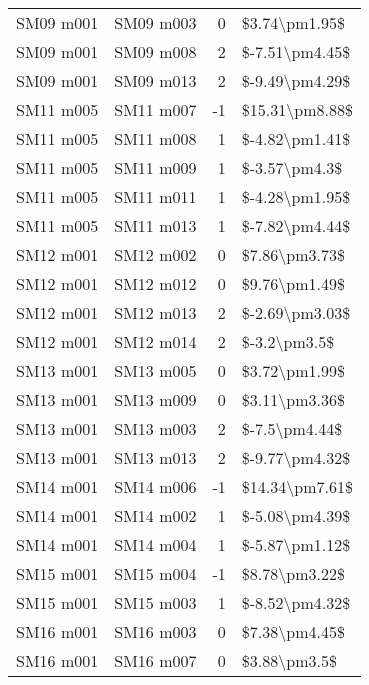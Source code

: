 \begin{longtable}{llrl}
 SM09 m001 &     SM09 m003 &       0 &   \$3.74\textbackslash pm1.95\$ \\
 SM09 m001 &     SM09 m008 &       2 &  \$-7.51\textbackslash pm4.45\$ \\
 SM09 m001 &     SM09 m013 &       2 &  \$-9.49\textbackslash pm4.29\$ \\
 SM11 m005 &     SM11 m007 &      -1 &  \$15.31\textbackslash pm8.88\$ \\
 SM11 m005 &     SM11 m008 &       1 &  \$-4.82\textbackslash pm1.41\$ \\
 SM11 m005 &     SM11 m009 &       1 &   \$-3.57\textbackslash pm4.3\$ \\
 SM11 m005 &     SM11 m011 &       1 &  \$-4.28\textbackslash pm1.95\$ \\
 SM11 m005 &     SM11 m013 &       1 &  \$-7.82\textbackslash pm4.44\$ \\
 SM12 m001 &     SM12 m002 &       0 &   \$7.86\textbackslash pm3.73\$ \\
 SM12 m001 &     SM12 m012 &       0 &   \$9.76\textbackslash pm1.49\$ \\
 SM12 m001 &     SM12 m013 &       2 &  \$-2.69\textbackslash pm3.03\$ \\
 SM12 m001 &     SM12 m014 &       2 &    \$-3.2\textbackslash pm3.5\$ \\
 SM13 m001 &     SM13 m005 &       0 &   \$3.72\textbackslash pm1.99\$ \\
 SM13 m001 &     SM13 m009 &       0 &   \$3.11\textbackslash pm3.36\$ \\
 SM13 m001 &     SM13 m003 &       2 &   \$-7.5\textbackslash pm4.44\$ \\
 SM13 m001 &     SM13 m013 &       2 &  \$-9.77\textbackslash pm4.32\$ \\
 SM14 m001 &     SM14 m006 &      -1 &  \$14.34\textbackslash pm7.61\$ \\
 SM14 m001 &     SM14 m002 &       1 &  \$-5.08\textbackslash pm4.39\$ \\
 SM14 m001 &     SM14 m004 &       1 &  \$-5.87\textbackslash pm1.12\$ \\
 SM15 m001 &     SM15 m004 &      -1 &   \$8.78\textbackslash pm3.22\$ \\
 SM15 m001 &     SM15 m003 &       1 &  \$-8.52\textbackslash pm4.32\$ \\
 SM16 m001 &     SM16 m003 &       0 &   \$7.38\textbackslash pm4.45\$ \\
 SM16 m001 &     SM16 m007 &       0 &    \$3.88\textbackslash pm3.5\$ \\

\end{longtable}
